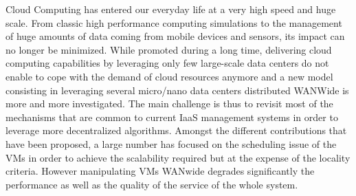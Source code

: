 
Cloud Computing has entered our everyday life at a very high speed and huge
scale. From classic high performance computing simulations to the management of
huge amounts of data coming from mobile devices and sensors, its impact can no
longer be minimized.
While promoted during a long time, delivering cloud computing capabilities by
leveraging only few large-scale data centers do not enable to cope with the
demand of cloud resources anymore and a new model consisting in leveraging
several micro/nano data centers distributed WANWide is more and more
investigated.
The main challenge is thus to revisit most of the mechanisms that are common
to current IaaS management systems in order to leverage more decentralized
algorithms. Amongst the different contributions that have been proposed, a large number has focused on the scheduling issue of the VMs 
in order to achieve the scalability required but at the expense of the locality criteria. 
However manipulating VMs WANwide degrades significantly the performance as well as the quality of the service of the whole system. 

% 

